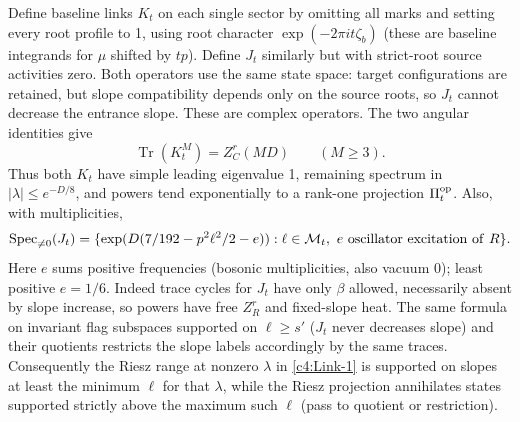 Define baseline links \(K_t\) on each single sector by omitting all marks and setting every root profile to 1, using root character \(\exp(-2\pi i t\zeta_b)\) (these are baseline integrands for \(\mu\) shifted by \(tp\)). Define \(J_t\) similarly but with strict-root source activities zero. Both operators use the same state space: target configurations are retained, but slope compatibility depends only on the source roots, so \(J_t\) cannot decrease the entrance slope. These are complex operators. The two angular identities give
\[
 \operatorname{Tr}(K_t^M)=Z_C^r(MD)\qquad (M\ge3).
\]
Thus both \(K_t\) have simple leading eigenvalue 1, remaining spectrum in \(|\lambda|\le e^{-D/8}\), and powers tend exponentially to a rank-one projection \(\Pi_t^{\rm op}\). Also, with multiplicities,
\begin{equation}
 \operatorname{Spec}_{\ne0}(J_t)
 =\{\exp(D(7/192-p^2\ell^2/2-e)):\ell\in\mathcal M_t,\
                    e\ {\rm oscillator\ excitation\ of}\ R\}.                    \label{c4:Link-1}
\end{equation}
Here \(e\) sums positive frequencies (bosonic multiplicities, also vacuum 0); least positive \(e=1/6\). Indeed trace cycles for \(J_t\) have only \(\beta\) allowed, necessarily absent by slope increase, so powers have free \(Z_R^r\) and fixed-slope heat. The same formula on invariant flag subspaces supported on \(\ell\ge s'\) (\(J_t\) never decreases slope) and their quotients restricts the slope labels accordingly by the same traces. Consequently the Riesz range at nonzero \(\lambda\) in \eqref{c4:Link-1} is supported on slopes at least the minimum \(\ell\) for that \(\lambda\), while the Riesz projection annihilates states supported strictly above the maximum such \(\ell\) (pass to quotient or restriction).

